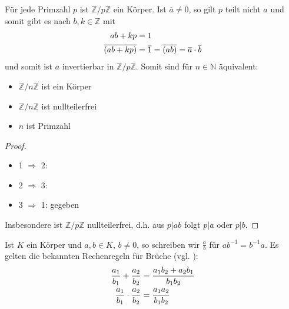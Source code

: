 \begin{example}
	Für jede Primzahl $p$ ist $\mathbb Z /p \mathbb Z$ ein Körper. Ist $\overline{a}\neq \overline{0}$, so gilt 
	$p$ teilt nicht $a$ und somit gibt es nach  $b,k \in \mathbb Z$ mit \\
	\begin{align}
		ab+kp &= 1 \notag \\
		\overline{(ab+kp)} &= \overline{1} = \overline{(ab)} = \overline{a} \cdot \overline{b} \notag
	\end{align}
	und somit ist $\overline{a}$ invertierbar in $\mathbb Z /p \mathbb Z$. Somit sind für $n \in \mathbb N$
	äquivalent:
	\begin{itemize}
		\item $\mathbb Z /n \mathbb Z$ ist ein Körper
		\item $\mathbb Z /n \mathbb Z$ ist nullteilerfrei
		\item $n$ ist Primzahl
	\end{itemize}
\end{example}
\begin{proof}
	\begin{itemize}
		\item 1 $\Rightarrow$ 2: 
		\item 2 $\Rightarrow$ 3: 
		\item 3 $\Rightarrow$ 1: gegeben
	\end{itemize}
	Insbesondere ist $\mathbb Z /p \mathbb Z$ nullteilerfrei, d.h. aus $p\vert ab$ folgt $p\vert a$ oder $p\vert b$.
\end{proof}

\begin{remark}
	Ist $K$ ein Körper und $a,b\in K$, $b\neq 0$, so schreiben wir $\frac{a}{b}$ für $ab^{-1}=b^{-1}a$. Es gelten die bekannten Rechenregeln für Brüche (vgl. ):
	\begin{align}
		\frac{a_1}{b_1}+\frac{a_2}{b_2}&=\frac{a_1b_2+a_2b_1}{b_1b_2}\notag \\
		\frac{a_1}{b_1}\cdot\frac{a_2}{b_2}&=\frac{a_1a_2}{b_1b_2}\notag
	\end{align}
\end{remark}